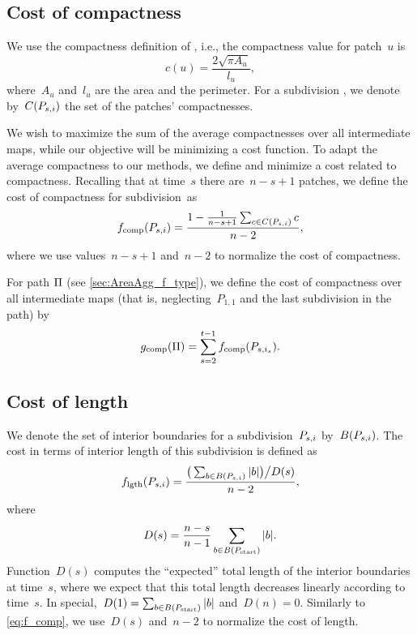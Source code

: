 \documentclass[acmsmall,natbib=false]{acmart}
\begin{document}
\subsection{Cost of compactness}
\label{sec:AreaAgg_f_comp}

We use the compactness definition of \citet{Frolov1975}, 
i.e., the compactness value for patch~$u$ is
\begin{equation*}
\label{eq:comp}
c(u)=\frac{2 \sqrt{\pi A_u}}{l_u},
\end{equation*}
where~$A_u$ and~$l_u$ are 
the area and the perimeter. 
For a subdivision \Psnode, we denote by~$C(P_{s,i})$ 
the set of the patches' compactnesses.

We wish to maximize the sum of the average compactnesses 
over all intermediate maps,
while our objective will be
minimizing a cost function.
To adapt the average compactness to our methods, 
we define and minimize a cost related to compactness.
Recalling that at time~$s$ there are~$n-s+1$ patches,
we define the cost of compactness for subdivision~\Psnode as
\begin{equation}
\label{eq:f_comp}
f_{\mathrm{comp}}(P_{s,i})=
\frac{1-\frac{1}{n-s+1} \sum_{c\in C(P_{s,i})}c}{n-2},
\end{equation}
where we use values~$n-s+1$ and~$n-2$ to normalize 
the cost of compactness.

For path $\Pi$ (see \sect\ref{sec:AreaAgg_f_type}),  
we define the cost of compactness over all 
intermediate maps
(that is, neglecting~$P_{1,1}$ 
and the last subdivision in the path) by
\begin{equation}
\label{eq:g_comp}
g_\mathrm{comp}(\Pi)=
\sum_{s=2}^{t-1}f_{\mathrm{comp}}(P_{s,i_s}).
\end{equation}


\subsection{Cost of length}
\label{sec:AreaAgg_costlength}

We denote the set of interior boundaries 
for a subdivision~$P_{s,i}$ by~$B(P_{s,i})$.
The cost in terms of interior length of 
this subdivision is defined as
\begin{equation}
\label{eq:f_length}
f_{\mathrm{lgth}}(P_{s,i})=
\frac{\big(\sum_{b\in B (P_{s,i})} 
	|b|\big)\big/D(s)}{n-2}, 
\end{equation} 
where 
\begin{equation}
\label{eq:AreaAgg_Norm}
D(s)=\frac{n-s}{n-1} \sum_{b\in B (P_\mathrm{start})} |b|.
\end{equation}
Function~$D(s)$ computes the ``expected'' total length of 
the interior boundaries at time~$s$,
where we expect that this total length decreases linearly
according to time~$s$.
In special,~$D(1) = \sum_{b\in B (P_\mathrm{start})} |b|$
and~$D(n) = 0$.
Similarly to \eq\ref{eq:f_comp}, 
we use~$D(s)$ and~$n-2$ to normalize 
the cost of length.
\end{document}
